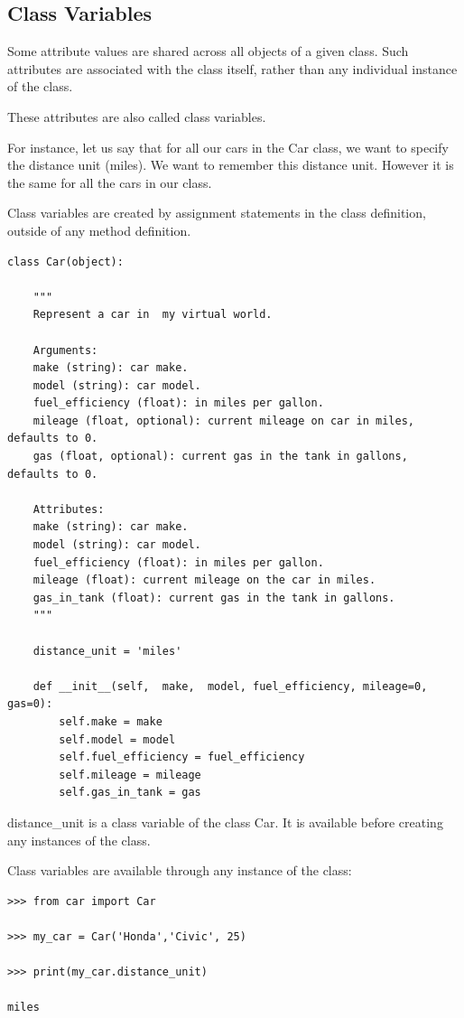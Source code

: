 \documentclass{article}
\begin{document}
\subsection{Class Variables}

Some attribute values are shared across all objects of a given class. Such attributes are associated with the class itself, rather than any individual instance of the class.

These attributes are also called class variables.

For instance, let us say that for all our cars in the Car class, we want to specify the distance unit (miles).  We want to remember this distance unit.  However it is the same for all the cars in our class.

Class variables are created by assignment statements in the class definition, outside of any method definition.

\begin{lstlisting}
class Car(object):

    """
    Represent a car in  my virtual world.

    Arguments:
    make (string): car make.
    model (string): car model.
    fuel_efficiency (float): in miles per gallon.
    mileage (float, optional): current mileage on car in miles, defaults to 0.
    gas (float, optional): current gas in the tank in gallons, defaults to 0.

    Attributes:
    make (string): car make.
    model (string): car model.
    fuel_efficiency (float): in miles per gallon.
    mileage (float): current mileage on the car in miles.
    gas_in_tank (float): current gas in the tank in gallons.
    """

    distance_unit = 'miles'

    def __init__(self,  make,  model, fuel_efficiency, mileage=0, gas=0):
        self.make = make
        self.model = model
        self.fuel_efficiency = fuel_efficiency
        self.mileage = mileage
        self.gas_in_tank = gas
\end{lstlisting}
 
distance{\_}unit is a class variable of the class Car.  It is available before creating any instances of the class.

Class variables are available through any instance of the class:

\begin{lstlisting}
>>> from car import Car

>>> my_car = Car('Honda','Civic', 25)

>>> print(my_car.distance_unit)

miles
\end{lstlisting}
\end{document}
